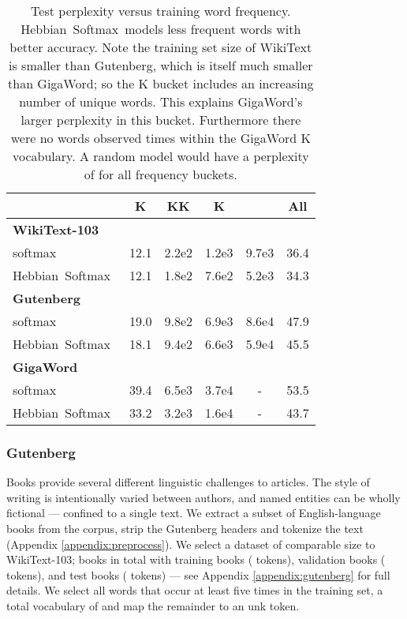 \documentclass{article} \usepackage{hyperref}
\newcommand{\model}{\hbox{Hebbian Softmax }}
\begin{document}
\begin{table}[]
    \small
    \centering
    \begin{small}
    \caption{Test perplexity versus training word frequency. \model models less frequent words with better accuracy. Note the training set size of WikiText is smaller than Gutenberg, which is itself much smaller than GigaWord; so the K bucket includes an increasing number of unique words. This explains GigaWord's larger perplexity in this bucket. Furthermore there were no words observed  times within the GigaWord K vocabulary. A random model would have a perplexity of  for all frequency buckets.}
    \end{small}
    \begin{small}
    \begin{sc}
    \setlength{\tabcolsep}{4pt}
    \begin{tabular}{l c c c c c}
    \toprule
     & K & KK & K &  & All \\ 
     \midrule
    \textbf{WikiText-103} & & & \\
    \scriptsize{softmax} & 12.1 & 2.2e2 & 1.2e3 & 9.7e3 & 36.4 \\ 
    \scriptsize{\model} & 12.1 & 1.8e2 & 7.6e2 & 5.2e3 & 34.3 \\ 
    \midrule
    \textbf{Gutenberg} & & & & \\
    \scriptsize{softmax} & 19.0 & 9.8e2 & 6.9e3 & 8.6e4 & 47.9 \\ 
    \scriptsize{\model} & 18.1 & 9.4e2 & 6.6e3 & 5.9e4 & 45.5 \\ 
    \midrule
    \textbf{GigaWord} & & & & \\
    \scriptsize{softmax} & 39.4 & 6.5e3 & 3.7e4 & - & 53.5  \\ 
    \scriptsize{\model} & 33.2 & 3.2e3 & 1.6e4 & - & 43.7 \\ 
    \bottomrule
    \end{tabular}
    \end{sc}
    \end{small}
    \label{tab:lm_breakdown}
    \vskip -0.1in
\end{table}
\subsubsection{Gutenberg}
Books provide several different linguistic challenges to articles. The style of writing is intentionally varied between authors, and named entities can be wholly fictional --- confined to a single text. We extract a subset of English-language books from the corpus, strip the Gutenberg headers and tokenize the text (Appendix \ref{appendix:preprocess}). We select a dataset of comparable size to WikiText-103;  books in total with  training books ( tokens),  validation books ( tokens), and  test books ( tokens) --- see Appendix \ref{appendix:gutenberg} for full details. We select all words that occur at least five times in the training set, a total vocabulary of  and map the remainder to an unk token.
\end{document}
